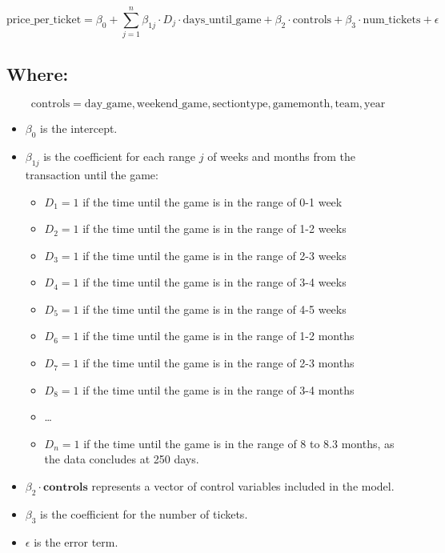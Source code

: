\documentclass[
  12pt]{article}
\providecommand{\tightlist}{%
  \setlength{\itemsep}{0pt}\setlength{\parskip}{0pt}}\usepackage{longtable,booktabs,array}
\begin{document}
\[
\mathrm{price\_per\_ticket} = \beta_0 + \sum_{j=1}^{n} \beta_{1j} \cdot D_j \cdot \mathrm{days\_until\_game} + \beta_2 \cdot \mathrm{controls} + \beta_3 \cdot \mathrm{num\_tickets} + \epsilon
\]

\subsection{Where:}\label{where-1}

\[
\mathbf{\mathrm{controls}} = \mathrm{day\_game, weekend\_game, sectiontype, gamemonth, team, year}
\]

\begin{itemize}
\tightlist
\item
  \(\beta_0\) is the intercept.
\item
  \(\beta_{1j}\) is the coefficient for each range \(j\) of weeks and
  months from the transaction until the game:

  \begin{itemize}
  \tightlist
  \item
    \(D_1 = 1\) if the time until the game is in the range of 0-1 week
  \item
    \(D_2 = 1\) if the time until the game is in the range of 1-2 weeks
  \item
    \(D_3 = 1\) if the time until the game is in the range of 2-3 weeks
  \item
    \(D_4 = 1\) if the time until the game is in the range of 3-4 weeks
  \item
    \(D_5 = 1\) if the time until the game is in the range of 4-5 weeks
  \item
    \(D_6 = 1\) if the time until the game is in the range of 1-2 months
  \item
    \(D_7 = 1\) if the time until the game is in the range of 2-3 months
  \item
    \(D_8 = 1\) if the time until the game is in the range of 3-4 months
  \item
    \ldots{}
  \item
    \(D_n = 1\) if the time until the game is in the range of 8 to 8.3
    months, as the data concludes at 250 days.
  \end{itemize}
\item
  \(\beta_2 \cdot \mathbf{\text{controls}}\) represents a vector of
  control variables included in the model.
\item
  \(\beta_3\) is the coefficient for the number of tickets.
\item
  \(\epsilon\) is the error term.
\end{itemize}
\end{document}
